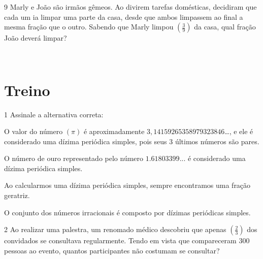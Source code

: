 \num{9} Marly e João são irmãos gêmeos. Ao divirem tarefas domésticas,
decidiram que cada um ia limpar uma parte da casa, desde que ambos
limpassem ao final a mesma fração que o outro. Sabendo que Marly limpou
$(\frac{3}{9})$ da casa, qual fração João deverá limpar?

\\

\section{Treino}

\num{1} Assinale a alternativa correta:

\begin{escolha}
\item O valor do número $(\pi)$ é aproximadamente
$3,14159265358979323846$\ldots, e ele é considerado uma dízima periódica
simples, pois seus 3 últimos números são pares.
\item O número de ouro representado pelo número $1.61803399$... é considerado
uma dízima periódica simples.
\item Ao calcularmos uma dízima periódica simples, sempre encontramos uma
fração geratriz.
\item O conjunto dos números irracionais é composto por dízimas periódicas
simples.
\end{escolha}







\num{2} Ao realizar uma palestra, um renomado médico descobriu que apenas
$(\frac{2}{3})$ dos convidados se consultava regularmente. Tendo em
vista que compareceram 300 pessoas ao evento, quantos participantes não
costumam se consultar?


